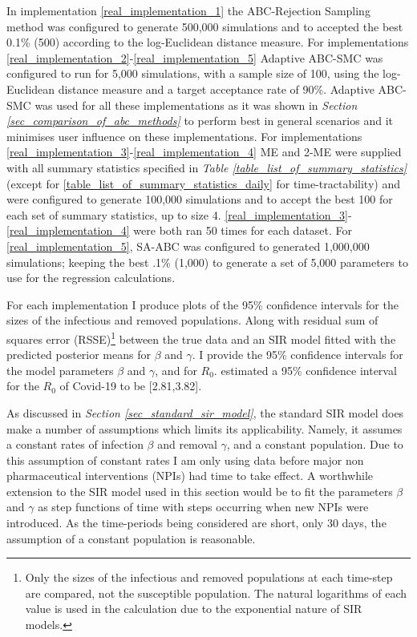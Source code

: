 \documentclass[11pt,a4paper]{article}
\theoremstyle{break}
\begin{document}
  \noindent In implementation \ref{real_implementation_1} the ABC-Rejection Sampling method was configured to generate 500,000 simulations and to accepted the best 0.1\% (500) according to the log-Euclidean distance measure. For implementations \ref{real_implementation_2}-\ref{real_implementation_5} Adaptive ABC-SMC was configured to run for 5,000 simulations, with a sample size of 100, using the log-Euclidean distance measure and a target acceptance rate of 90\%. Adaptive ABC-SMC was used for all these implementations as it was shown in \textit{Section \ref{sec_comparison_of_abc_methods}} to perform best in general scenarios and it minimises user influence on these implementations. For implementations \ref{real_implementation_3}-\ref{real_implementation_4} ME and 2-ME were supplied with all summary statistics specified in \textit{Table \ref{table_list_of_summary_statistics}} (except for \ref{table_list_of_summary_statistics_daily} for time-tractability) and were configured to generate 100,000 simulations and to accept the best 100 for each set of summary statistics, up to size 4.  \ref{real_implementation_3}-\ref{real_implementation_4} were both ran 50 times for each dataset. For \ref{real_implementation_5}, SA-ABC was configured to generated 1,000,000 simulations; keeping the best .1\% (1,000) to generate a set of 5,000 parameters to use for the regression calculations.

  \par For each implementation I produce plots of the 95\% confidence intervals for the sizes of the infectious and removed populations. Along with residual sum of squares error (RSSE)\footnote{Only the sizes of the infectious and removed populations at each time-step are compared, not the susceptible population. The natural logarithms of each value is used in the calculation due to the exponential nature of SIR models.} between the true data and an SIR model fitted with the predicted posterior means for $\beta$ and $\gamma$. I provide the 95\% confidence intervals for the model parameters $\beta$ and $\gamma$, and for $R_0$. \cite[]{estimated_r0_covid_19} estimated a 95\% confidence interval for the $R_0$ of Covid-19 to be [2.81,3.82].

  \par As discussed in \textit{Section \ref{sec_standard_sir_model}}, the standard SIR model does make a number of assumptions which limits its applicability. Namely, it assumes a constant rates of infection $\beta$ and removal $\gamma$, and a constant population. Due to this assumption of constant rates I am only using data before major non pharmaceutical interventions (NPIs) had time to take effect. A worthwhile extension to the SIR model used in this section would be to fit the parameters $\beta$ and $\gamma$ as step functions of time with steps occurring when new NPIs were introduced. As the time-periods being considered are short, only 30 days, the assumption of a constant population is reasonable.
\end{document}
